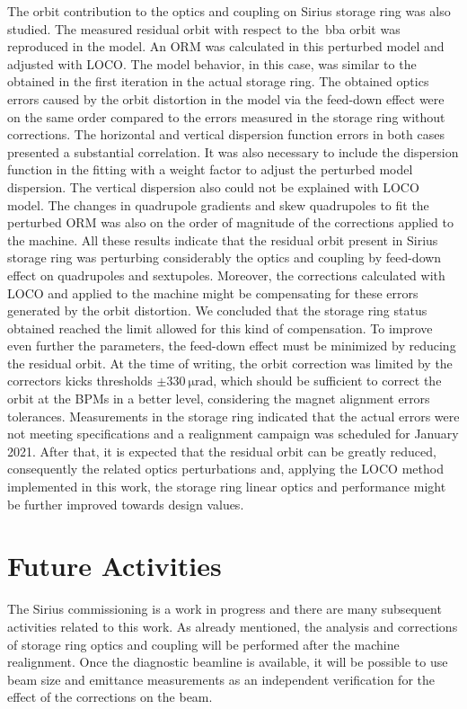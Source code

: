 The orbit contribution to the optics and coupling on Sirius storage ring was also studied. The measured residual orbit with respect to the~\gls{bba} orbit was reproduced in the model. An ORM was calculated in this perturbed model and adjusted with LOCO. The model behavior, in this case, was similar to the obtained in the first iteration in the actual storage ring. The obtained optics errors caused by the orbit distortion in the model via the feed-down effect were on the same order compared to the errors measured in the storage ring without corrections. The horizontal and vertical dispersion function errors in both cases presented a substantial correlation. It was also necessary to include the dispersion function in the fitting with a weight factor to adjust the perturbed model dispersion. The vertical dispersion also could not be explained with LOCO model. The changes in quadrupole gradients and skew quadrupoles to fit the perturbed ORM was also on the order of magnitude of the corrections applied to the machine. All these results indicate that the residual orbit present in Sirius storage ring was perturbing considerably the optics and coupling by feed-down effect on quadrupoles and sextupoles. Moreover, the corrections calculated with LOCO and applied to the machine might be compensating for these errors generated by the orbit distortion. We concluded that the storage ring status obtained reached the limit allowed for this kind of compensation. To improve even further the parameters, the feed-down effect must be minimized by reducing the residual orbit. At the time of writing, the orbit correction was limited by the correctors kicks thresholds $\pm\SI{330}{\micro\radian}$, which should be sufficient to correct the orbit at the BPMs in a better level, considering the magnet alignment errors tolerances. Measurements in the storage ring indicated that the actual errors were not meeting specifications and a realignment campaign was scheduled for January 2021. After that, it is expected that the residual orbit can be greatly reduced, consequently the related optics perturbations and, applying the LOCO method implemented in this work, the storage ring linear optics and performance might be further improved towards design values. 
\section*{Future Activities}
The Sirius commissioning is a work in progress and there are many subsequent activities related to this work. As already mentioned, the analysis and corrections of storage ring optics and coupling will be performed after the machine realignment. Once the diagnostic beamline is available, it will be possible to use beam size and emittance measurements as an independent verification for the effect of the corrections on the beam. 

